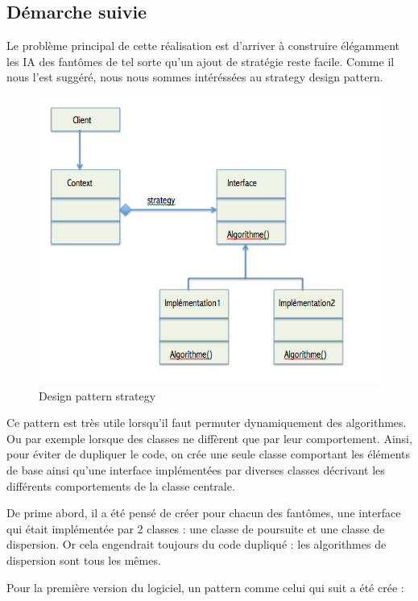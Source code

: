 \documentclass[a4paper,12pt]{report} %
\begin{document}
\subsection{Démarche suivie}
Le problème principal de cette réalisation est d'arriver à construire élégamment les IA des fantômes de tel sorte qu'un ajout de stratégie reste facile.
Comme il nous l'est suggéré, nous nous sommes intéréssées au strategy design pattern.

\begin{figure}[!h] %
		\centering
		\includegraphics[scale=0.7]{ressources/StrategyDesignPattern.png}
		\caption{Design pattern strategy}\label{figure2}
\end{figure} 



Ce pattern est très utile lorsqu'il faut permuter dynamiquement des algorithmes.
Ou par exemple lorsque des classes ne diffèrent que par leur comportement. Ainsi, pour éviter de dupliquer le code, on crée une seule classe comportant les éléments de base ainsi qu'une interface implémentées par diverses classes décrivant les différents comportements de la classe centrale.

De prime abord, il a été pensé de créer pour chacun des fantômes, une interface qui était implémentée par 2 classes : une classe de poursuite et une classe de dispersion.
Or cela engendrait toujours du code dupliqué : les algorithmes de dispersion sont tous les mêmes.

Pour la première version du logiciel, un pattern comme celui qui suit a été crée :
\end{document}
